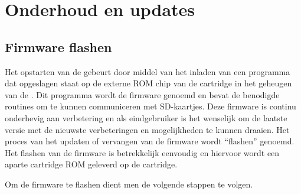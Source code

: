 \chapter{Onderhoud en updates}
\chapterpreamble

%
%
%
\section{Firmware flashen}
\label{sec:firmware-flash}


Het opstarten van de \product gebeurt door middel van het inladen van een programma dat opgeslagen staat op de externe ROM chip van de  cartridge in het geheugen van de . Dit programma wordt de firmware genoemd en bevat de benodigde routines om te kunnen communiceren met SD-kaartjes. Deze firmware is continu onderhevig aan verbetering en als eindgebruiker is het wenselijk om de laatste versie met de nieuwste verbeteringen en mogelijkheden te kunnen draaien. Het proces van het updaten of vervangen van de firmware wordt ``flashen'' genoemd. Het flashen van de firmware is betrekkelijk eenvoudig en hiervoor wordt een aparte cartridge ROM geleverd op de  cartridge.


Om de firmware te flashen dient men de volgende stappen te volgen. 

